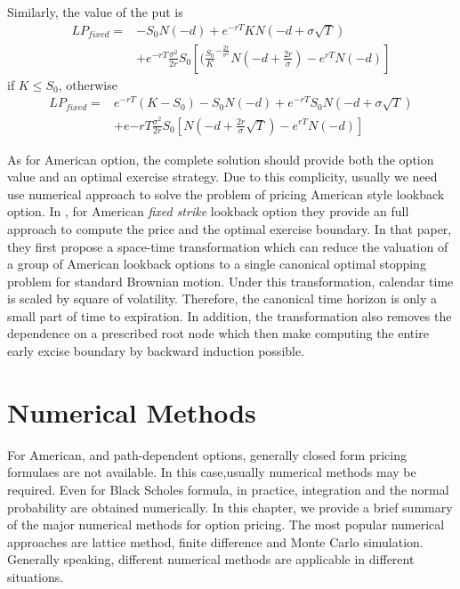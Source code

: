 \documentclass[11pt]{book}
\begin{document}
Similarly, the value of the put is 
\begin{equation}
\begin{split}
LP_{fixed} =& -S_0 N(-d) + e^{-rT} KN(-d + \sigma \sqrt{T})  \\
&+ e^{-rT} \frac{\sigma^2}{2r} S_0 [ (\frac{S_0}{K}^{-\frac{2r}{\sigma^2}}N(-d+\frac{2r}{\sigma}) - e^{rT}N(-d)]
\end{split}
\end{equation}
if $K\leq S_0$, otherwise
\begin{equation}
\begin{split}
LP_{fixed} = & e^{-rT} (K-S_0) - S_0 N(-d) + e^{-rT}S_0 N (-d + \sigma \sqrt{T}) \\
&+ e{-rT} \frac{\sigma^2}{2r} S_0 [ N(-d + \frac{2r}{\sigma} \sqrt{T}) -e^{rT}N(-d)]
\end{split}
\end{equation}
 





As for American option, the complete solution should provide both the option value and an optimal exercise strategy. Due to this complicity, usually we need use numerical approach to solve the problem of pricing American style lookback option. In \cite{Lim2004}, for American \emph {fixed strike} lookback option they provide an full approach to compute the price and the optimal exercise boundary. In that paper, they first propose a space-time transformation which can reduce the valuation of a group of American lookback options to a single canonical optimal stopping problem for standard Brownian motion. Under this transformation, calendar time is scaled by square of volatility. Therefore, the canonical time horizon is only a small part of time to expiration. In addition, the transformation also removes the dependence on a prescribed root node which then make computing the entire early excise boundary by backward induction possible.


\chapter{Numerical Methods}

For American, and path-dependent options, generally closed form pricing formulaes are not available. In this case,usually numerical methods may be required. Even for Black Scholes formula, in practice, integration and the normal probability are obtained numerically. In this chapter, we provide a brief summary of the major numerical methods for option pricing. The most popular numerical approaches are lattice method, finite difference and Monte Carlo simulation. Generally speaking, different numerical methods are applicable in different situations. 
\end{document}
